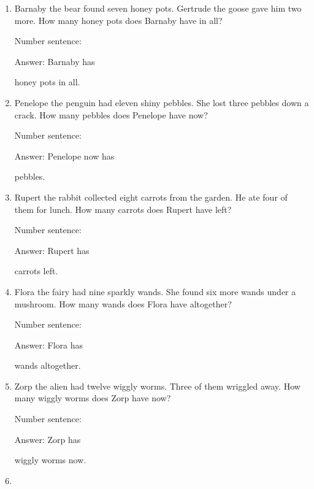 \documentclass{tufte-book}
\begin{document}
\begin{enumerate}

\item
  Barnaby the bear found seven honey pots. Gertrude the goose gave him
  two more. How many honey pots does Barnaby have in all?\medskip\par
  Number sentence:
  \dotfill\medskip\par
  Answer: Barnaby has
  \dotfill\medskip\par\mbox{}\dotfill\medskip\par\mbox{}\dotfill\bigskip
  honey pots in all.
\item
  Penelope the penguin had eleven shiny pebbles. She lost three pebbles
  down a crack. How many pebbles does Penelope have now?\medskip\par
  Number sentence:
  \dotfill\medskip\par
  Answer: Penelope now has
  \dotfill\medskip\par\mbox{}\dotfill\medskip\par\mbox{}\dotfill\bigskip
  pebbles.
\item
  Rupert the rabbit collected eight carrots from the garden. He ate four
  of them for lunch. How many carrots does Rupert have left?\medskip\par
  Number sentence:
  \dotfill\medskip\par
  Answer: Rupert has
  \dotfill\medskip\par\mbox{}\dotfill\medskip\par\mbox{}\dotfill\bigskip
  carrots left.
\item
  Flora the fairy had nine sparkly wands. She found six more wands under
  a mushroom. How many wands does Flora have altogether?\medskip\par
  Number sentence:
  \dotfill\medskip\par
  Answer: Flora has
  \dotfill\medskip\par\mbox{}\dotfill\medskip\par\mbox{}\dotfill\bigskip
  wands altogether.
\item
  Zorp the alien had twelve wiggly worms. Three of them wriggled away.
  How many wiggly worms does Zorp have now?\medskip\par
  Number sentence:
  \dotfill\medskip\par
  Answer: Zorp has
  \dotfill\medskip\par\mbox{}\dotfill\medskip\par\mbox{}\dotfill\bigskip
  wiggly worms now.
\item

\end{enumerate}
\end{document}

